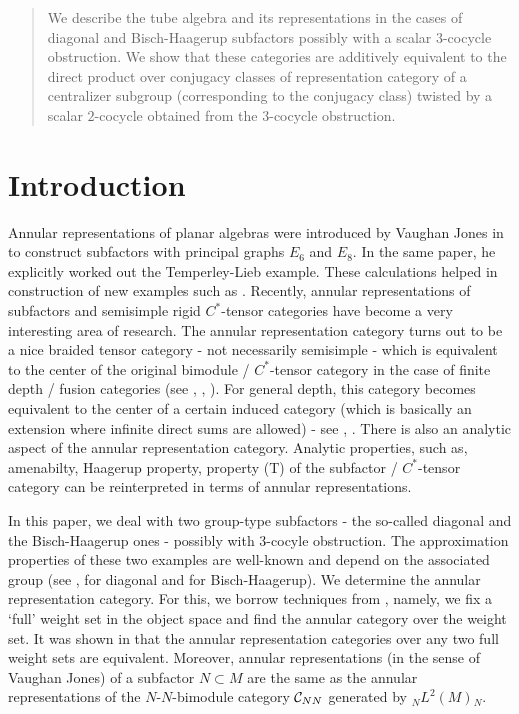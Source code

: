 \begin{abstract}
We describe the tube algebra and its representations in the cases of diagonal and Bisch-Haagerup subfactors possibly with a scalar $ 3 $-cocycle obstruction. We show that these categories are additively equivalent to the direct product over conjugacy classes of representation category of a centralizer subgroup (corresponding to the conjugacy class) twisted by a scalar $ 2 $-cocycle obtained from the $ 3 $-cocycle obstruction.
\end{abstract}
\section{Introduction}
Annular representations of planar algebras were introduced by Vaughan Jones in \cite{Jon3} to construct subfactors with principal graphs $E_6$ and $E_8$. In the same paper,
he explicitly worked out the Temperley-Lieb example.
These calculations helped in construction of new examples such as \cite{Pet}.
Recently, annular representations of subfactors and semisimple rigid $ C^* $-tensor categories have become a very interesting area of research.
The annular representation category turns out to be a nice braided tensor category - not necessarily semisimple - which is equivalent to the center of the original bimodule / $ C^* $-tensor category in the case of finite depth / fusion categories (see \cite{DGG1}, \cite{DGG2}, \cite{GJ}).
For general depth, this category becomes equivalent to the center of a certain induced category (which is basically an extension where infinite direct sums are allowed) - see \cite{NY}, \cite{PV}.
There is also an analytic aspect of the annular representation category.
Analytic properties, such as, amenabilty, Haagerup property, property (T) of the subfactor / $ C^* $-tensor category can be reinterpreted in terms of annular representations.

In this paper, we deal with two group-type subfactors - the so-called diagonal and the Bisch-Haagerup ones - possibly with $ 3 $-cocyle obstruction.
The approximation properties of these two examples are well-known and depend on the associated group (see \cite{frenchpop}, \cite{Pop94} for diagonal and \cite{BH} for Bisch-Haagerup).
We determine the annular representation category.
For this, we borrow techniques from \cite{GJ}, namely, we fix a `full' weight set in the object space and find the annular category over the weight set.
It was shown in \cite{GJ} that the annular representation categories  over any two full weight sets are equivalent.
Moreover, annular representations (in the sense of Vaughan Jones) of a subfactor $ N\subset M $  are the same as the annular representations of the $ N$-$N $-bimodule category $ \mathcal C_{NN} $ generated by $ {}_N L^2 (M) {}_N $.

